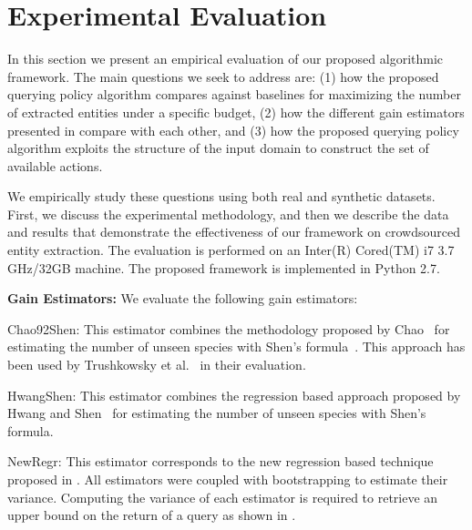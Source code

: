 \section{Experimental Evaluation}
\label{sec:exps}
In this section we present an empirical evaluation of our proposed algorithmic framework. The main questions we seek to address are: (1) how the proposed querying policy algorithm compares against baselines for maximizing the number of extracted entities under a specific budget, (2) how the different gain estimators presented in  compare with each other, and (3) how the proposed querying policy algorithm exploits the structure of the input domain to construct the set of available actions.

We empirically study these questions using both real and synthetic datasets. First, we discuss the experimental methodology, and then we describe the data and results that demonstrate the effectiveness of our framework on crowdsourced entity extraction. The evaluation is performed on an Inter(R) Cored(TM) i7 3.7 GHz/32GB machine. The proposed framework is implemented in Python 2.7. 

\vspace{5pt}\noindent\textbf{Gain Estimators:} We evaluate the following gain estimators:
\squishlist
\item Chao92Shen: This estimator combines the methodology proposed by Chao~\cite{chao:1992} for estimating the number of unseen species  with Shen's formula~. This approach has been used by Trushkowsky et al.~\cite{trushkowsky:2013} in their evaluation.
\item HwangShen: This estimator combines the regression based approach proposed by Hwang and Shen~\cite{hwang:2010} for estimating the number of unseen species with Shen's formula. 
\item NewRegr: This estimator corresponds to the new regression based technique proposed in .
\squishend
All estimators were coupled with bootstrapping to estimate their variance. Computing the variance of each estimator is required to retrieve an upper bound on the return of a query as shown in .

